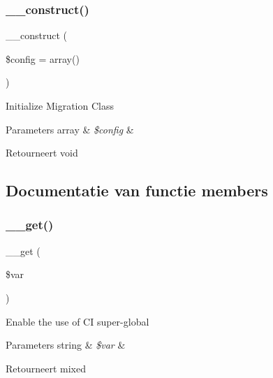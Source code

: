 \subsubsection{\texorpdfstring{\_\_construct()}{\_\_construct()}}
{\footnotesize\ttfamily \+\_\+\+\_\+construct (\begin{DoxyParamCaption}\item[{}]{\$config = {\ttfamily array()} }\end{DoxyParamCaption})}

Initialize Migration Class


\begin{DoxyParams}[1]{Parameters}
array & {\em \$config} & \\
\hline
\end{DoxyParams}
\begin{DoxyReturn}{Retourneert}
void 
\end{DoxyReturn}


\subsection{Documentatie van functie members}
\mbox{\label{class_c_i___migration_a8fb2d9cdca17b87400e780b9f9720933}} 
\subsubsection{\texorpdfstring{\_\_get()}{\_\_get()}}
{\footnotesize\ttfamily \+\_\+\+\_\+get (\begin{DoxyParamCaption}\item[{}]{\$var }\end{DoxyParamCaption})}

Enable the use of CI super-\/global


\begin{DoxyParams}[1]{Parameters}
string & {\em \$var} & \\
\hline
\end{DoxyParams}
\begin{DoxyReturn}{Retourneert}
mixed 
\end{DoxyReturn}
\mbox{\label{class_c_i___migration_a71388693ccdefaea24ca259a0f389806}} 
